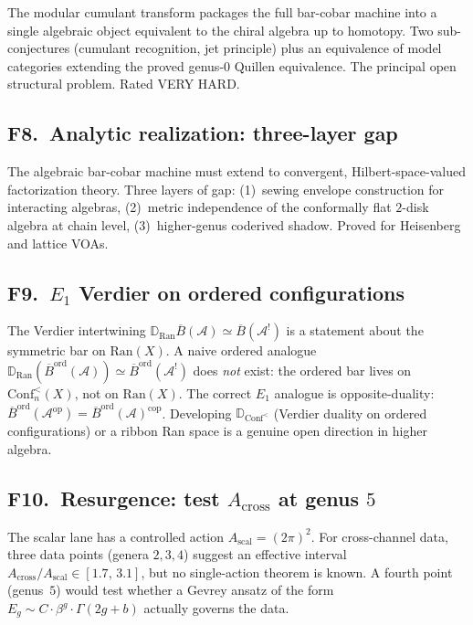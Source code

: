 \documentclass[11pt]{article}
\newcommand{\cA}{\mathcal{A}}
\newcommand{\barB}{\overline{B}}
\newcommand{\bD}{\mathbb{D}}
\begin{document}
The modular cumulant transform packages the full bar-cobar machine
into a single algebraic object equivalent to the chiral algebra up
to homotopy.  Two sub-conjectures (cumulant recognition, jet
principle) plus an equivalence of model categories extending the
proved genus-$0$ Quillen equivalence.  The principal open structural
problem.  Rated VERY HARD.

\subsection{F8.\ Analytic realization: three-layer gap}

The algebraic bar-cobar machine must extend to convergent,
Hilbert-space-valued factorization theory.  Three layers of gap:
(1)~sewing envelope construction for interacting algebras,
(2)~metric independence of the conformally flat $2$-disk algebra at
chain level, (3)~higher-genus coderived shadow.  Proved for
Heisenberg and lattice VOAs.

\subsection{F9.\ $E_1$ Verdier on ordered configurations}

The Verdier intertwining
$\bD_{\mathrm{Ran}} \barB(\cA) \simeq \barB(\cA^!)$ is a statement
about the symmetric bar on $\mathrm{Ran}(X)$.  A naive ordered
analogue $\bD_{\mathrm{Ran}}(\barB^{\mathrm{ord}}(\cA))
\simeq \barB^{\mathrm{ord}}(\cA^!)$ does \emph{not} exist: the
ordered bar lives on $\mathrm{Conf}_n^{<}(X)$, not on
$\mathrm{Ran}(X)$.  The correct $E_1$ analogue is opposite-duality:
$\barB^{\mathrm{ord}}(\cA^{\mathrm{op}})
= \barB^{\mathrm{ord}}(\cA)^{\mathrm{cop}}$.
Developing $\bD_{\mathrm{Conf}^{<}}$ (Verdier duality on ordered
configurations) or a ribbon Ran space is a genuine open direction in
higher algebra.

\subsection{F10.\ Resurgence: test $A_{\mathrm{cross}}$ at genus $5$}

The scalar lane has a controlled action
$A_{\mathrm{scal}}=(2\pi)^2$.  For cross-channel data, three data
points (genera $2,3,4$) suggest an effective interval
$A_{\mathrm{cross}}/A_{\mathrm{scal}} \in [1.7,\, 3.1]$, but no
single-action theorem is known.  A fourth point (genus~$5$) would
test whether a Gevrey ansatz of the form
$E_g \sim C \cdot \beta^g \cdot \Gamma(2g + b)$
actually governs the data.
\end{document}
